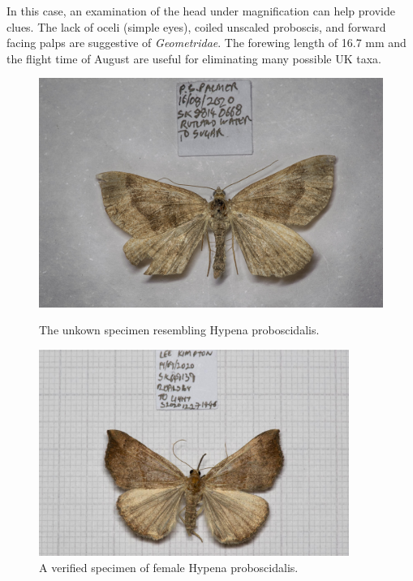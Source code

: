 \documentclass[]{article}
\begin{document}
In this case, an examination of the head under magnification can help provide clues. 
The lack of oceli (simple eyes), coiled unscaled proboscis, and forward facing palps are suggestive of \textit{Geometridae}. The forewing length of 16.7 mm and the flight time of August are useful for eliminating many possible UK taxa.

\begin{figure}
	\centering
	\begin{minipage}{0.45\textwidth}
		\centering
	\includegraphics[width=0.9\linewidth]{images/202009131026PJP-1}
	\caption{The unkown specimen resembling Hypena proboscidalis.}
	\label{fig:202009131026pjp-1}
	\end{minipage}\hfill
	\begin{minipage}{0.45\textwidth}
		\centering
		\includegraphics[width=0.9\textwidth]{S202012271446-1} %
		\caption{A verified specimen of female Hypena proboscidalis.}
		\label{fig:S202012271446-1}
	\end{minipage}
\end{figure}
\end{document}
